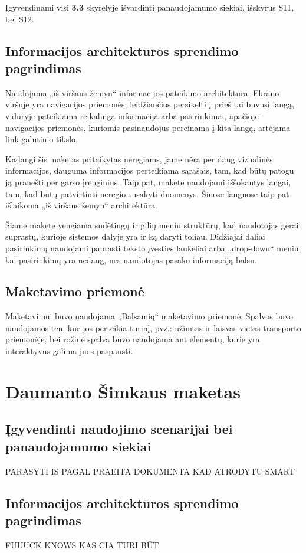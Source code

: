 \documentclass{VUMIFPSkursinis}
\begin{document}
Įgyvendinami visi \textbf{3.3} skyrelyje išvardinti panaudojamumo siekiai, išskyrus S11, bei S12.

\subsection{Informacijos architektūros sprendimo pagrindimas}
Naudojama „iš viršaus žemyn“ informacijos pateikimo architektūra. Ekrano viršuje yra navigacijos priemonės, leidžiančios persikelti į prieš tai buvusį langą, viduryje pateikiama reikalinga informacija arba pasirinkimai, apačioje - navigacijos priemonės, kuriomis pasinaudojus pereinama į kita langą, artėjama link galutinio tikslo.

Kadangi šis maketas pritaikytas neregiams, jame nėra per daug vizualinės informacijos, dauguma informacijos perteikiama sąrašais, tam, kad būtų patogu ją pranešti per garso įrenginius. Taip pat, makete naudojami iššokantys langai, tam, kad būtų patvirtinti neregio susakyti duomenys. Šiuose languose taip pat išlaikoma  „iš viršaus žemyn“ architektūra.

Šiame makete vengiama sudėtingų ir gilių meniu struktūrų, kad naudotojas gerai suprastų, kurioje sistemos dalyje yra ir ką daryti toliau. Didžiajai daliai pasirinkimų naudojami paprasti teksto įvesties laukeliai arba „drop-down“ meniu, kai pasirinkimų yra nedaug, nes naudotojas pasako informaciją balsu.

\subsection{Maketavimo priemonė}
Maketavimui buvo naudojama „Balsamiq“ maketavimo priemonė. Spalvos buvo naudojamos ten, kur jos perteikia turinį, pvz.: užimtas ir laisvas vietas transporto priemonėje, bei rožinė spalva buvo naudojama ant elementų, kurie yra interaktyvūs-galima juos paspausti.

\section{Daumanto Šimkaus maketas}
\subsection{Įgyvendinti naudojimo scenarijai bei panaudojamumo siekiai}
PARASYTI IS PAGAL PRAEITA DOKUMENTA KAD ATRODYTU SMART

\subsection{Informacijos architektūros sprendimo pagrindimas}
FUUUCK KNOWS KAS CIA TURI BŪT
\end{document}
